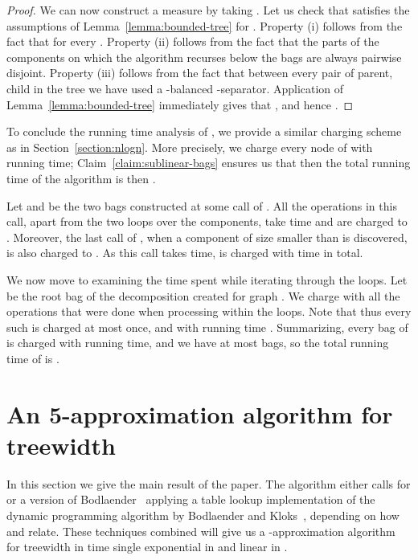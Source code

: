 \documentclass[a4paper,11pt]{article}
\theoremstyle{definition}
\theoremstyle{remark}
\begin{document}
\begin{proof}
  We can now construct a measure  by taking
  .  Let us check that  satisfies the
  assumptions of Lemma~\ref{lemma:bounded-tree} for .
  Property (i) follows from the fact that  for every
  .  Property (ii) follows from the fact that the parts of
  the components on which the algorithm recurses below the bags are
  always pairwise disjoint.  Property (iii) follows from the fact that
  between every pair of parent, child in the tree  we have used a
  -balanced -separator.  Application of
  Lemma~\ref{lemma:bounded-tree} immediately gives that , and hence .
\end{proof}

To conclude the running time analysis of , we provide a
similar charging scheme as in Section~\ref{section:nlogn}.  More
precisely, we charge every node of  with 
running time; Claim~\ref{claim:sublinear-bags} ensures us that then
the total running time of the algorithm is then .

Let  and  be the two bags constructed at some
call of .  All the operations in this call, apart from the
two loops over the components, take  time and are
charged to .  Moreover, the last call of , when a component
of size smaller than  is discovered, is also charged to .
As this call takes  time,  is charged with  time in total.

We now move to examining the time spent while iterating through the
loops.  Let  be the root bag of the decomposition created for
graph .  We charge  with all the operations that were done
when processing  within the loops.  Note that thus every such
 is charged at most once, and with running time .  Summarizing, every bag of  is charged with  running time, and we have at most  bags, so the
total running time of  is .










\section{An  5-approximation algorithm for treewidth}
\label{section:linear}
In this section we give the main result of the paper.  The algorithm
either calls  for  or a version of
Bodlaender~\cite{Bodlaender96} applying a table lookup implementation
of the dynamic programming algorithm by Bodlaender and
Kloks~\cite{BodlaenderK96}, depending on how  and  relate.
These techniques combined will give us a -approximation algorithm
for treewidth in time single exponential in  and linear in .
\end{document}
